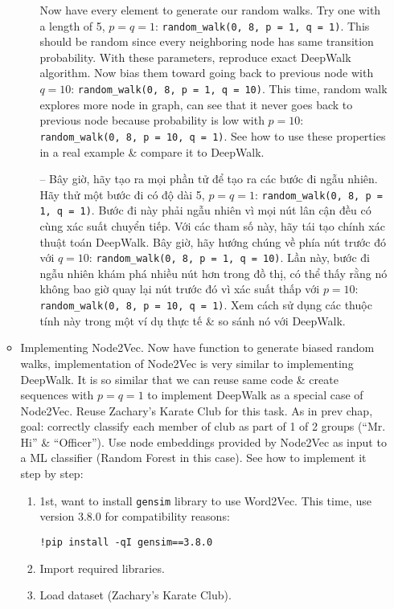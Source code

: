 \documentclass{article}
\begin{document}
\begin{itemize}
\begin{itemize}
\begin{itemize}
            Now have every element to generate our random walks. Try one with a length of 5, $p = q = 1$: \verb|random_walk(0, 8, p = 1, q = 1)|. This should be random since every neighboring node has same transition probability. With these parameters, reproduce exact DeepWalk algorithm. Now bias them toward going back to previous node with $q = 10$: \verb|random_walk(0, 8, p = 1, q = 10)|. This time, random walk explores more node in graph, can see that it never goes back to previous node because probability is low with $p = 10$: \verb|random_walk(0, 8, p = 10, q = 1)|. See how to use these properties in a real example \& compare it to DeepWalk.

            -- Bây giờ, hãy tạo ra mọi phần tử để tạo ra các bước đi ngẫu nhiên. Hãy thử một bước đi có độ dài 5, $p = q = 1$: \verb|random_walk(0, 8, p = 1, q = 1)|. Bước đi này phải ngẫu nhiên vì mọi nút lân cận đều có cùng xác suất chuyển tiếp. Với các tham số này, hãy tái tạo chính xác thuật toán DeepWalk. Bây giờ, hãy hướng chúng về phía nút trước đó với $q = 10$: \verb|random_walk(0, 8, p = 1, q = 10)|. Lần này, bước đi ngẫu nhiên khám phá nhiều nút hơn trong đồ thị, có thể thấy rằng nó không bao giờ quay lại nút trước đó vì xác suất thấp với $p = 10$: \verb|random_walk(0, 8, p = 10, q = 1)|. Xem cách sử dụng các thuộc tính này trong một ví dụ thực tế \& so sánh nó với DeepWalk.
        \end{itemize}
        \item {\sf Implementing Node2Vec.} Now have function to generate biased random walks, implementation of Node2Vec is very similar to implementing DeepWalk. It is so similar that we can reuse same code \& create sequences with $p = q = 1$ to implement DeepWalk as a special case of Node2Vec. Reuse Zachary's Karate Club for this task. As in prev chap, goal: correctly classify each member of club as part of 1 of 2 groups (``Mr. Hi'' \& ``Officer''). Use node embeddings provided by Node2Vec as input to a ML classifier (Random Forest in this case). See how to implement it step by step:
        \begin{enumerate}
            \item 1st, want to install {\tt gensim} library to use Word2Vec. This time, use version 3.8.0 for compatibility reasons:
            \begin{verbatim}
!pip install -qI gensim==3.8.0
            \end{verbatim}
            \item Import required libraries.
            \item Load dataset (Zachary's Karate Club).

\end{enumerate}
\end{itemize}
\end{itemize}
\end{document}
